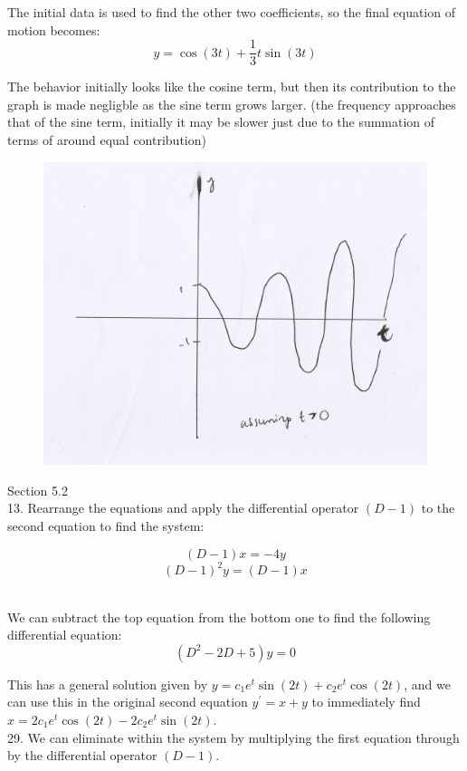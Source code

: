 \documentclass[11pt]{article}
\newcommand{\br}[1]{\left(#1\right)}
\begin{document}
The initial data is used to find the other two coefficients, so the final equation of motion becomes:
$$y = \cos(3t) + \frac{1}{3}t\sin(3t)$$

The behavior initially looks like the cosine term, but then its contribution to the graph is made negligble as the sine term grows larger. (the frequency approaches that of the sine term, initially it may be slower just due to the summation of terms of around equal contribution)

\begin{figure}[h]
    \centering
    \includegraphics[scale=0.5]{graph}
\end{figure}

Section 5.2 \\

13. Rearrange the equations and apply the differential operator $(D-1)$ to the second equation to find the system:

$$\br{D-1}x = -4y$$
$$\br{D-1}^2y = \br{D-1}x$$\

We can subtract the top equation from the bottom one to find the following differential equation:
$$\br{D^2-2D+5}y = 0$$

This has a general solution given by $y = c_1e^t\sin(2t) + c_2e^t\cos(2t)$, and we can use this in the original second equation $y^{\prime} = x+y$ to immediately find $x = 2c_1e^t\cos(2t) - 2c_2e^t\sin(2t)$.\\

29. We can eliminate within the system by multiplying the first equation through by the differential operator $\br{D-1}$.
\end{document}
